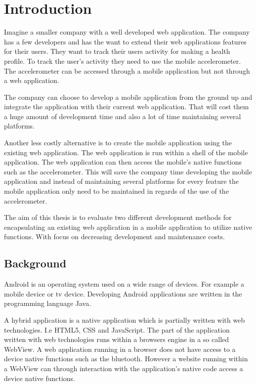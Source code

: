 \chapter{Introduction}
Imagine a smaller company with a well developed web application. The company has a few developers and has the want to extend their web applications features for their users. They want to track their users activity for making a health profile. To track the user's activity they need to use the mobile accelerometer. The accelerometer can be accessed through a mobile application but not through a web application. 

The company can choose to develop a mobile application from the ground up and integrate the application with their current web application. That will cost them a huge amount of development time and also a lot of time maintaining several platforms.

Another less costly alternative is to create the mobile application using the existing web application. The web application is run within a shell of the mobile application. The web application can then access the mobile’s native functions such as the accelerometer. This will save the company time developing the mobile application and instead of maintaining several platforms for every feature the mobile application only need to be maintained in regards of the use of the accelerometer. 

The aim of this thesis is to evaluate two different development methods for encapsulating an existing web application in a mobile application to utilize native functions. With focus on decreasing development and maintenance costs.


\section{Background}
Android is an operating system used on a wide range of devices. For example a mobile device or tv device. Developing Android applications are written in the programming language Java. 

A hybrid application is a native application which is partially written with web technologies. I.e HTML5, CSS and JavaScript. The part of the application written with web technologies runs within a browsers engine in a so called WebView. A web application running in a browser does not have access to a device native functions such as the bluetooth. However a website running within a WebView can through interaction with the application's native code access a device native functions.

